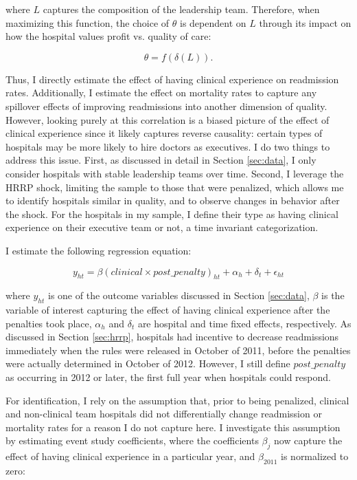 \documentclass[12pt]{article}
\begin{document}
    \noindent where $L$ captures the composition of the leadership team. Therefore, when maximizing this function, the choice of $\theta$ is dependent on $L$ through its impact on how the hospital values profit vs. quality of care:

    $$\theta = f(\delta(L)).$$

    Thus, I directly estimate the effect of having clinical experience on readmission rates. Additionally, I estimate the effect on mortality rates to capture any spillover effects of improving readmissions into another dimension of quality. However, looking purely at this correlation is a biased picture of the effect of clinical experience since it likely captures reverse causality: certain types of hospitals may be more likely to hire doctors as executives. I do two things to address this issue. First, as discussed in detail in Section \ref{sec:data}, I only consider hospitals with stable leadership teams over time. Second, I leverage the HRRP shock, limiting the sample to those that were penalized, which allows me to identify hospitals similar in quality, and to observe changes in behavior after the shock. For the hospitals in my sample, I define their type as having clinical experience on their executive team or not, a time invariant categorization. 

    I estimate the following regression equation:

    \begin{equation}
    \label{eq:main}
    y_{ht} = \beta (clinical \times post\_penalty)_{ht} + \alpha_{h} + \delta_t + \epsilon_{ht}
    \end{equation}

    \noindent where $y_{ht}$ is one of the outcome variables discussed in Section \ref{sec:data}, $\beta$ is the variable of interest capturing the effect of having clinical experience after the penalties took place, $\alpha_h$ and $\delta_t$ are hospital and time fixed effects, respectively. As discussed in Section \ref{sec:hrrp}, hospitals had incentive to decrease readmissions immediately when the rules were released in October of 2011, before the penalties were actually determined in October of 2012. However, I still define $post\_penalty$ as occurring in 2012 or later, the first full year when hospitals could respond. 

    For identification, I rely on the assumption that, prior to being penalized, clinical and non-clinical team hospitals did not differentially change readmission or mortality rates for a reason I do not capture here. I investigate this assumption by estimating event study coefficients, where the coefficients $\beta_j$ now capture the effect of having clinical experience in a particular year, and $\beta_{2011}$ is normalized to zero:
\end{document}
